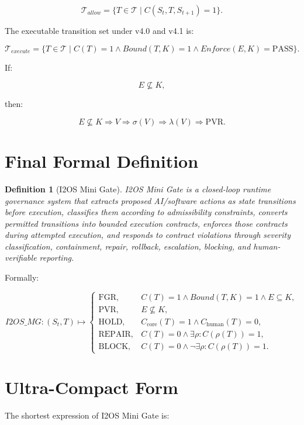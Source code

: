 \documentclass[11pt,a4paper]{article}
\newtheorem{definition}{Definition}
\newcommand{\HOLD}{\mathrm{HOLD}}
\newcommand{\REPAIR}{\mathrm{REPAIR}}
\newcommand{\BLOCK}{\mathrm{BLOCK}}
\newcommand{\PASS}{\mathrm{PASS}}
\newcommand{\FGR}{\mathrm{FGR}}
\newcommand{\PVR}{\mathrm{PVR}}
\begin{document}
\[
\mathcal{T}_{allow}
=
\{
T\in\mathcal{T}
\mid
C(S_t,T,S_{t+1})=1
\}.
\]

The executable transition set under v4.0 and v4.1 is:

\[
\mathcal{T}_{execute}
=
\{
T\in\mathcal{T}
\mid
C(T)=1
\land
Bound(T,K)=1
\land
Enforce(E,K)=\PASS
\}.
\]

If:

\[
E\nsubseteq K,
\]

then:

\[
E\nsubseteq K
\Rightarrow
V
\Rightarrow
\sigma(V)
\Rightarrow
\lambda(V)
\Rightarrow
\PVR.
\]

\section{Final Formal Definition}

\begin{definition}[I2OS Mini Gate]
I2OS Mini Gate is a closed-loop runtime governance system that extracts proposed AI/software actions as state transitions before execution, classifies them according to admissibility constraints, converts permitted transitions into bounded execution contracts, enforces those contracts during attempted execution, and responds to contract violations through severity classification, containment, repair, rollback, escalation, blocking, and human-verifiable reporting.
\end{definition}

Formally:

\[
I2OS\_MG
:
(S_t,T)
\mapsto
\begin{cases}
\FGR, & C(T)=1 \land Bound(T,K)=1 \land E\subseteq K,\\
\PVR, & E\nsubseteq K,\\
\HOLD, & C_{\mathrm{core}}(T)=1 \land C_{\mathrm{human}}(T)=0,\\
\REPAIR, & C(T)=0 \land \exists \rho : C(\rho(T))=1,\\
\BLOCK, & C(T)=0 \land \neg\exists \rho : C(\rho(T))=1.
\end{cases}
\]

\section{Ultra-Compact Form}

The shortest expression of I2OS Mini Gate is:
\end{document}
